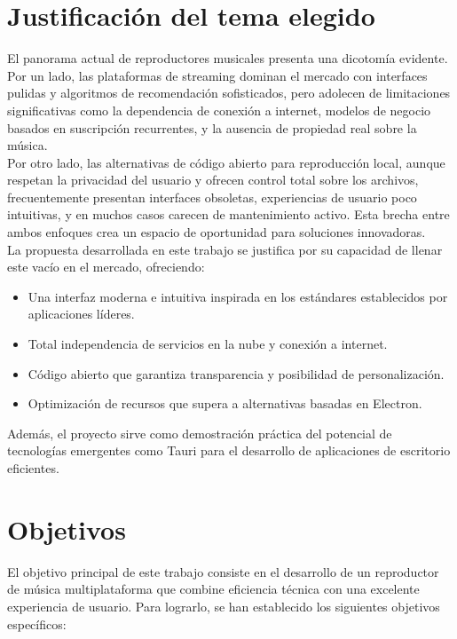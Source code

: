 \documentclass[11pt, a4paper]{article}
\begin{document}
\section{Justificación del tema elegido}

El panorama actual de reproductores musicales presenta una dicotomía evidente. Por un lado, las plataformas de streaming dominan el mercado con interfaces pulidas y algoritmos de recomendación sofisticados, pero adolecen de limitaciones significativas como la dependencia de conexión a internet, modelos de negocio basados en suscripción recurrentes, y la ausencia de propiedad real sobre la música. \\

Por otro lado, las alternativas de código abierto para reproducción local, aunque respetan la privacidad del usuario y ofrecen control total sobre los archivos, frecuentemente presentan interfaces obsoletas, experiencias de usuario poco intuitivas, y en muchos casos carecen de mantenimiento activo. Esta brecha entre ambos enfoques crea un espacio de oportunidad para soluciones innovadoras. \\

La propuesta desarrollada en este trabajo se justifica por su capacidad de llenar este vacío en el mercado, ofreciendo:
\begin{itemize}
    \item Una interfaz moderna e intuitiva inspirada en los estándares establecidos por aplicaciones líderes.
    \item Total independencia de servicios en la nube y conexión a internet.
    \item Código abierto que garantiza transparencia y posibilidad de personalización.
    \item Optimización de recursos que supera a alternativas basadas en Electron.
\end{itemize}

Además, el proyecto sirve como demostración práctica del potencial de tecnologías emergentes como Tauri para el desarrollo de aplicaciones de escritorio eficientes.

\section{Objetivos}

El objetivo principal de este trabajo consiste en el desarrollo de un reproductor de música multiplataforma que combine eficiencia técnica con una excelente experiencia de usuario. Para lograrlo, se han establecido los siguientes objetivos específicos:
\end{document}
